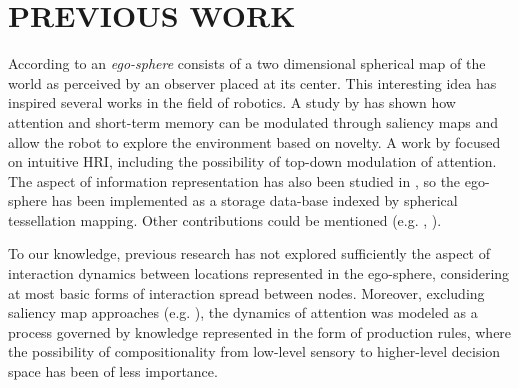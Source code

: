 \documentclass[letterpaper, 10 pt, conference]{ieeeconf}  %
\begin{document}
	
	
	\section{PREVIOUS WORK}
	\label{sec:previous}
	

	According to \cite{albus1991} an \textit{ego-sphere} consists of a two dimensional spherical map of the world as perceived by an observer placed at its center. This interesting idea has inspired several works in the field of robotics. A study by \cite{ruesch2008} has shown how attention and short-term memory can be modulated through saliency maps and allow the robot to explore the environment based on novelty. A work by \cite{bodiroza2011} focused on intuitive HRI, including the possibility of top-down modulation of attention. The aspect of information representation has also been studied in \cite{peters2009sensory}, so the ego-sphere has been implemented as a storage data-base indexed by spherical tessellation mapping. Other contributions could be mentioned (e.g. \cite{grotz2017}, \cite{marques2022}).%
	
	
	To our knowledge, previous research has not explored sufficiently the aspect of interaction dynamics between locations represented in the ego-sphere, considering at most basic forms of interaction spread between nodes. Moreover, excluding saliency map approaches (e.g. \cite{ruesch2008}), the dynamics of attention was modeled as a process governed by knowledge represented in the form of production rules, where the possibility of compositionality from low-level sensory to higher-level decision space has been of less importance. 
	 
	
	
\end{document}

